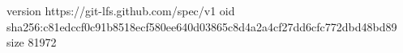 version https://git-lfs.github.com/spec/v1
oid sha256:c81edccf0c91b8518ecf580ee640d03865c8d4a2a4cf27dd6cfc772dbd48bd89
size 81972
